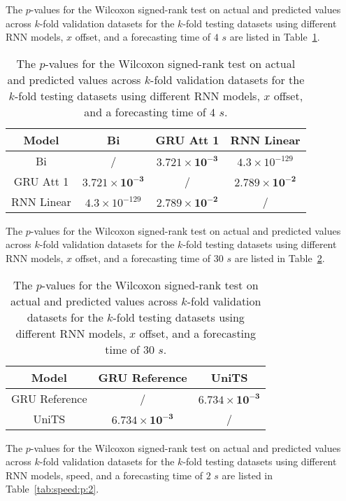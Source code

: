 The $p$-values for the Wilcoxon signed-rank test on actual and predicted values across $k$-fold validation datasets for the $k$-fold testing datasets using different RNN models, $x$ offset, and a forecasting time of $4$ $s$ are listed in Table~\ref{tab:longitude:no:abs:p:4}.

\begin{table}[!ht]
	\centering
	\begin{tabular}{|c|c|c|c|}
		\hline
		Model & Bi & GRU Att 1 & RNN Linear \\ \hline
		Bi & / & $\mathbf{3.721 \times 10^{-3}}$ & $4.3 \times 10^{-129}$ \\ \hline
		GRU Att 1 & $\mathbf{3.721 \times 10^{-3}}$ & / & $\mathbf{2.789 \times 10^{-2}}$ \\ \hline
		RNN Linear & $4.3 \times 10^{-129}$ & $\mathbf{2.789 \times 10^{-2}}$ & / \\ \hline
	\end{tabular}
	\caption{The $p$-values for the Wilcoxon signed-rank test on actual and predicted values across $k$-fold validation datasets for the $k$-fold testing datasets using different RNN models, $x$ offset, and a forecasting time of $4$ $s$.}
	\label{tab:longitude:no:abs:p:4}
\end{table}

The $p$-values for the Wilcoxon signed-rank test on actual and predicted values across $k$-fold validation datasets for the $k$-fold testing datasets using different RNN models, $x$ offset, and a forecasting time of $30$ $s$ are listed in Table~\ref{tab:longitude:no:abs:p:30}.

\begin{table}[!ht]
	\centering
	\begin{tabular}{|c|c|c|}
		\hline
		Model & GRU Reference & UniTS \\ \hline
		GRU Reference & / & $\mathbf{6.734 \times 10^{-3}}$ \\ \hline
		UniTS & $\mathbf{6.734 \times 10^{-3}}$ & / \\ \hline
	\end{tabular}
	\caption{The $p$-values for the Wilcoxon signed-rank test on actual and predicted values across $k$-fold validation datasets for the $k$-fold testing datasets using different RNN models, $x$ offset, and a forecasting time of $30$ $s$.}
	\label{tab:longitude:no:abs:p:30}
\end{table}

The $p$-values for the Wilcoxon signed-rank test on actual and predicted values across $k$-fold validation datasets for the $k$-fold testing datasets using different RNN models, speed, and a forecasting time of $2$ $s$ are listed in Table~\ref{tab:speed:p:2}.

